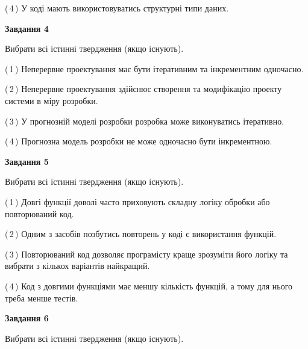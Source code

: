 \documentclass[10pt, ukrainian]{article}
\begin{document}
{\begin {large}
(\,4\,) У коді мають використовуватись структурні типи даних. %


{\begin {center}\textbf{Завдання 4}\end {center}}\par
Вибрати всі істинні твердження (якщо існують).\par
\vspace{2mm}



(\,1\,) Неперервне проектування має бути ітеративним та інкрементним одночасно. %



(\,2\,) Неперервне проектування здійснює створення та модифікацію проекту системи в міру розробки. %



(\,3\,) У прогнозній моделі розробки розробка може виконуватись ітеративно. %



(\,4\,) Прогнозна модель розробки не може одночасно бути інкрементною. %


{\begin {center}\textbf{Завдання 5}\end {center}}\par
Вибрати всі істинні твердження (якщо існують).\par
\vspace{2mm}



(\,1\,) Довгі функції доволі часто приховують складну логіку обробки або повторюваний код. %



(\,2\,) Одним з засобів позбутись повторень у коді є використання функцій. %



(\,3\,) Повторюваний код дозволяє програмісту краще зрозуміти його логіку та вибрати з кількох варіантів найкращий. %



(\,4\,) Код з довгими функціями має меншу кількість функцій, а тому для нього треба менше тестів. %

\newpage

{\begin {center}\textbf{Завдання 6}\end {center}}\par
Вибрати всі істинні твердження (якщо існують).\par
\vspace{2mm}




\end{large}}
\end{document}
